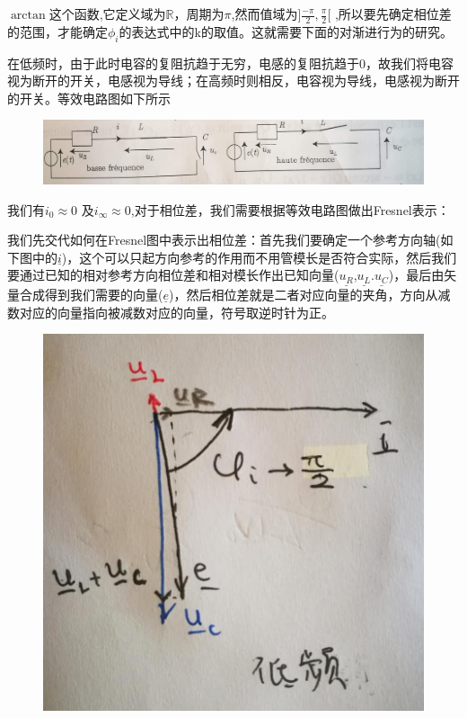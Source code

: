 \documentclass[12pt]{book}
\theoremstyle{definition}\newtheorem{dfn}{Définition}[chapter]
\theoremstyle{plain}\newtheorem{thm}{Théorème}[chapter]
\theoremstyle{plain}\newtheorem{prp}{Proposition}[chapter]
\theoremstyle{plain}\newtheorem{lem}{\bf Lemme}[chapter]
\theoremstyle{plain}\newtheorem{axm}{\bf Axiome}[chapter]
\theoremstyle{plain}\newtheorem{lmm}{\bf Lemme}[chapter]
\theoremstyle{plain}\newtheorem{cor}{\bf Corollaire}[chapter]
\theoremstyle{remark}\newtheorem{rem}{Remarque}[chapter]
\begin{document}
$\arctan$这个函数,它定义域为$\mathbb{R}$，周期为$\pi$,然而值域为$]\frac{-\pi}{2},\frac{\pi}{2}[ $
,所以要先确定相位差的范围，才能确定$\phi_{i}$的表达式中的k的取值。这就需要下面的对渐进行为的研究。


在低频时，由于此时电容的复阻抗趋于无穷，电感的复阻抗趋于0，故我们将电容视为断开的开关，电感视为导线；在高频时则相反，电容视为导线，电感视为断开的开关。等效电路图如下所示
\begin{figure}[H]
	\centering
	\includegraphics[scale=0.15]{Etude du circuit RLC serie-Resonances//3}
\end{figure}
我们有$i_0\approx 0$ 及$i_{\infty}\approx0$,对于相位差，我们需要根据等效电路图做出Fresnel表示：

我们先交代如何在Fresnel图中表示出相位差：首先我们要确定一个参考方向轴(如下图中的$\underline{i}$)，这个可以只起方向参考的作用而不用管模长是否符合实际，然后我们要通过已知的相对参考方向相位差和相对模长作出已知向量($\underline{u_R}$,$\underline{u_L}$.$\underline{u_C}$)，最后由矢量合成得到我们需要的向量($\underline{e}$)，然后相位差就是二者对应向量的夹角，方向从减数对应的向量指向被减数对应的向量，符号取逆时针为正。
\begin{figure}[H]
	\centering
	\includegraphics[scale=0.2]{Etude du circuit RLC serie-Resonances//4}
\end{figure}
\end{document}
